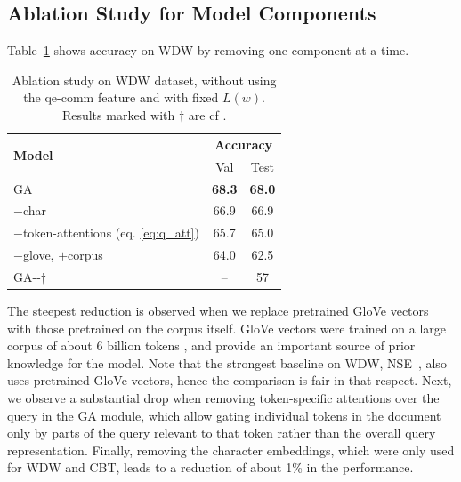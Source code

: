\documentclass[11pt,a4paper]{article}
\begin{document}
\subsection{Ablation Study for Model Components}
\label{app:ablation}
Table~\ref{tab:ablation} shows accuracy on WDW by removing one component at a time.
\begin{table}[!htbp]
\centering
\caption{\small Ablation study on WDW dataset, without using the qe-comm feature and with fixed $L(w)$. Results marked with $\dagger$ are cf \citet{onishi2016did}.}
\label{tab:ablation}
\begin{tabular}{@{}l|c|c@{}}
\toprule
\multirow{2}{*}{\textbf{Model}} & \multicolumn{2}{c}{\textbf{Accuracy}} \\ \cmidrule(l){2-3} 
                                          & Val                & Test              \\ \midrule
GA                                       & \textbf{68.3}               & \textbf{68.0}             \\
\quad $-$char                               & 66.9               & 66.9              \\
\quad $-$token-attentions (eq. \ref{eq:q_att})  & 65.7               & 65.0              \\
\quad $-$glove, $+$corpus                & 64.0               & 62.5              \\
 \midrule
GA-{}-$\dagger$                & --               & 57              \\ \bottomrule
\end{tabular}
\end{table}
The steepest reduction is observed when we replace pretrained GloVe vectors with those pretrained on the corpus itself. GloVe vectors were trained on a large corpus of about 6 billion tokens \citep{pennington2014glove}, and provide an important source of prior knowledge for the model. Note that the strongest baseline on WDW, NSE~\citep{munkhdalai2016reasoning}, also uses pretrained GloVe vectors, hence the comparison is fair in that respect. Next, we observe a substantial drop when removing token-specific attentions over the query in the GA module, which allow gating individual tokens in the document only by parts of the query relevant to that token rather than the overall query representation. Finally, removing the character embeddings, which were only used for WDW and CBT, leads to a reduction of about 1\% in the performance. 
\end{document}
